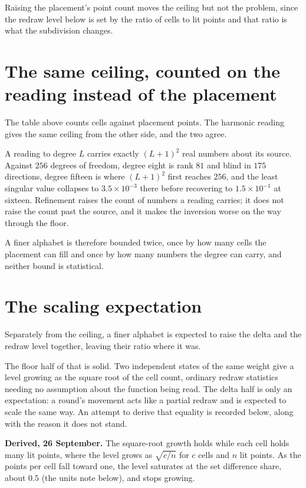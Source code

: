 Raising the placement's point count moves the ceiling but not the problem, since the redraw level below is set by the ratio of cells to lit points and that ratio is what the subdivision changes.

\section{The same ceiling, counted on the reading instead of the placement}

The table above counts cells against placement points. The harmonic reading gives the same ceiling from the other side, and the two agree.

A reading to degree \(L\) carries exactly \((L+1)^2\) real numbers about its source. Against \(256\) degrees of freedom, degree eight is rank \(81\) and blind in \(175\) directions, degree fifteen is where \((L+1)^2\) first reaches \(256\), and the least singular value collapses to \(3.5 \times 10^{-3}\) there before recovering to \(1.5 \times 10^{-1}\) at sixteen. Refinement raises the count of numbers a reading carries; it does not raise the count past the source, and it makes the inversion worse on the way through the floor.

A finer alphabet is therefore bounded twice, once by how many cells the placement can fill and once by how many numbers the degree can carry, and neither bound is statistical.

\section{The scaling expectation}

Separately from the ceiling, a finer alphabet is expected to raise the delta and the redraw level together, leaving their ratio where it was.

The floor half of that is solid. Two independent states of the same weight give a level growing as the square root of the cell count, ordinary redraw statistics needing no assumption about the function being read. The delta half is only an expectation: a round's movement acts like a partial redraw and is expected to scale the same way. An attempt to derive that equality is recorded below, along with the reason it does not stand.

\textbf{Derived, 26 September.} The square-root growth holds while each cell holds many lit points, where the level grows as \(\sqrt{c/n}\) for \(c\) cells and \(n\) lit points. As the points per cell fall toward one, the level saturates at the set difference share, about \(0.5\) (the units note below), and stops growing.

